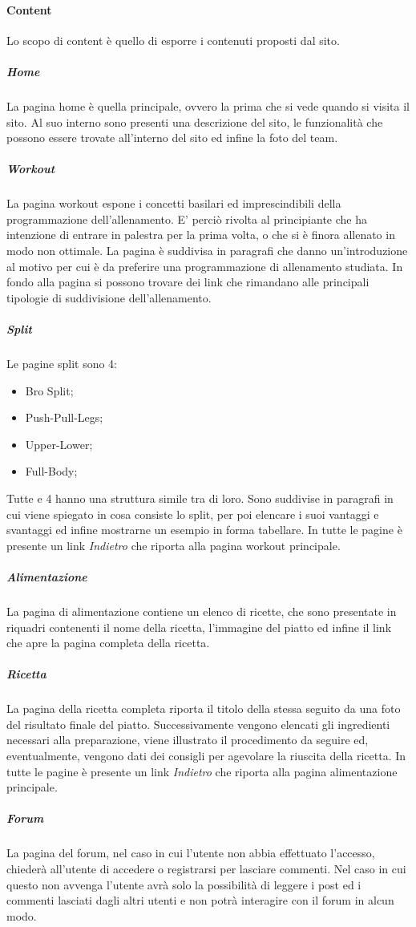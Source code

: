 \paragraph{Content}
Lo scopo di content è quello di esporre i contenuti proposti dal sito.
\subparagraph{Home}
La pagina home è quella principale, ovvero la prima che si vede quando si visita il sito. Al suo interno sono presenti una descrizione del sito, le funzionalità che possono essere trovate all'interno del sito ed infine la foto del team.
\subparagraph{Workout}
La pagina workout espone i concetti basilari ed imprescindibili della programmazione dell'allenamento. E' perciò rivolta al principiante che ha intenzione di entrare in palestra per la prima volta, o che si è finora allenato in modo non ottimale.
La pagina è suddivisa in paragrafi che danno un'introduzione al motivo per cui è da preferire una programmazione di allenamento studiata.
In fondo alla pagina si possono trovare dei link che rimandano alle principali tipologie di suddivisione dell'allenamento.
\subparagraph{Split}
Le pagine split sono 4:
\begin{itemize}
\item Bro Split;
\item Push-Pull-Legs;
\item Upper-Lower;
\item Full-Body;
\end{itemize}           
Tutte e 4 hanno una struttura simile tra di loro.
Sono suddivise in paragrafi in cui viene spiegato in cosa consiste lo split, per poi elencare i suoi vantaggi e svantaggi ed infine mostrarne un esempio in forma tabellare.
In tutte le pagine è presente un link \textit{Indietro} che riporta alla pagina workout principale. 
\subparagraph{Alimentazione}
La pagina di alimentazione contiene un elenco di ricette, che sono presentate in riquadri contenenti il nome della ricetta, l’immagine
del piatto ed infine il link che apre la pagina completa della ricetta. 
\subparagraph{Ricetta}
La pagina della ricetta completa riporta il titolo della stessa seguito da una foto del risultato finale del piatto. Successivamente vengono elencati gli ingredienti necessari alla preparazione, viene illustrato il procedimento da seguire ed, eventualmente, vengono dati dei consigli per agevolare la riuscita della ricetta. In tutte le pagine è presente un link \textit{Indietro} che riporta alla pagina alimentazione principale.
\subparagraph{Forum}
La pagina del forum, nel caso in cui l'utente non abbia effettuato l'accesso, chiederà all'utente di accedere o registrarsi per lasciare commenti. Nel caso in cui questo non avvenga l'utente avrà solo la possibilità di leggere i post ed i commenti lasciati dagli altri utenti e non potrà interagire con il forum in alcun modo.
